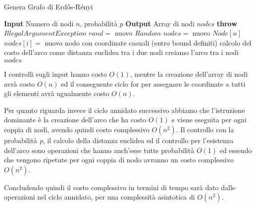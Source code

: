 \documentclass[12pt,a4paper]{report}
\begin{document}
\begin{algorithm}
\caption{Genera Grafo di Erdős-Rényi}
\label{alg:ER-gen-comp}
\begin{algorithmic}[1]
    \State \textbf{Input} Numero di nodi $n$, probabilità $p$
    \State \textbf{Output} Array di nodi $nodes$
        \State \textbf{throw} $IllegalArgumentException$
    \EndIf
    \State $rand=$ nuovo $Random$
    \State $nodes=$ nuovo $Node[n]$
        \State $nodes[i]=$ nuovo nodo con coordinate casuali (entro bound definiti)
    \EndFor
                \State calcolo del costo dell'arco come distanza euclidea tra i due nodi
                    \State creiamo l'arco tra i nodi
                \EndIf
            \EndIf
        \EndFor
    \EndFor
    \State \Return $nodes$
\end{algorithmic}
\end{algorithm}

I controlli sugli input hanno costo $O(1)$, mentre la creazione dell'array di nodi avrà costo $O(n)$ ed il conseguente ciclo for per assegnare le coordinate a tutti gli elementi avrà ugualmente costo $O(n)$. 

Per quanto riguarda invece il ciclo annidato successivo abbiamo che l'istruzione dominante è la creazione dell'arco che ha costo $O(1)$ e viene eseguita per ogni coppia di nodi, avendo quindi costo complessivo $O(n^2)$. Il controllo con la probabilità \textit{p}, il calcolo della distanza euclidea ed il controllo per l'esistenza dell'arco sono operazioni che hanno anch'esse tutte probabilità $O(1)$ ed essendo che vengono ripetute per ogni coppia di nodo avranno un costo complessivo $O(n^2)$.

\medskip

Concludendo quindi il costo complessivo in termini di tempo sarà dato dalle operazioni nel ciclo annidato, per una complessità asintotica di $O(n^2)$.


\end{document}
